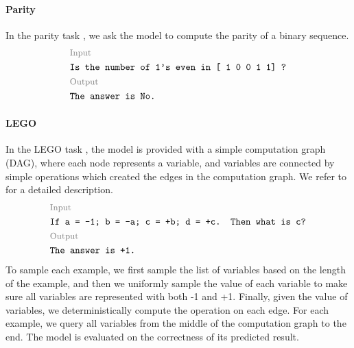 \documentclass{article}
\begin{document}
\paragraph{Parity}
In the parity task \citep{Anil2022:LengthFailure}, we ask the model to compute the parity of a binary sequence.
\[
  \begin{aligned}
     & \text{\footnotesize \color{gray} Input}          \\
     & \texttt{Is the number of 1's even in [ 1 0 0 1 1] ?}          \\
     & \text{\footnotesize \color{gray} Output}         \\
     & \texttt{The answer is No.}                        \\
  \end{aligned}
\]

\paragraph{LEGO}
In the LEGO task \citep{Zhang2023:LEGO}, the model is provided with a simple computation graph (DAG), where each node represents a variable, and variables are connected by simple operations which created the edges in the computation graph. We refer to \citet{Zhang2023:LEGO} for a detailed description.
\[
  \begin{aligned}
     & \text{\footnotesize \color{gray} Input}          \\
     & \texttt{If a = -1; b = -a; c = +b; d = +c. Then what is c?} \\
     & \text{\footnotesize \color{gray} Output}         \\
     & \texttt{The answer is +1.}                        \\
  \end{aligned}
\]
To sample each example, we first sample the list of variables based on the length of the example, and then we uniformly sample the value of each variable to make sure all variables are represented with both -1 and +1. Finally, given the value of variables, we deterministically compute the operation on each edge. For each example, we query all variables from the middle of the computation graph to the end. The model is evaluated on the correctness of its predicted result.
\end{document}
